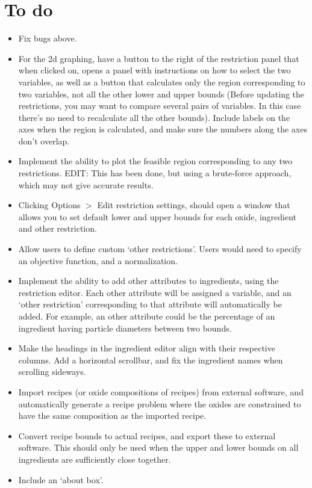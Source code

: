 \documentclass[a4paper,10pt]{article}
\begin{document}
\section{To do}
\begin{itemize}
\item Fix bugs above.
\item For the 2d graphing, have a button to the right of the restriction panel that when clicked on, opens a panel with instructions on how to select the two variables, as well as a button that calculates only the region corresponding to two variables, not all the other lower and upper bounds (Before updating the restrictions, you may want to compare several pairs of variables. In this case there's no need to recalculate all the other bounds). Include labels on the axes when the region is calculated, and make sure the numbers along the axes don't overlap. 
\item Implement the ability to plot the feasible region corresponding to any two restrictions. EDIT: This has been done, but using a brute-force approach, which may not give accurate results.
\item Clicking Options $>$ Edit restriction settings, should open a window that allows you to set default lower and upper bounds for each oxide, ingredient and other restriction.
\item Allow users to define custom `other restrictions'. Users would need to specify an objective function, and a normalization.
\item Implement the ability to add other attributes to ingredients, using the restriction editor. Each other attribute will be assigned a variable, and an `other restriction' corresponding to that attribute will automatically be added. For example, an other attribute could be the percentage of an ingredient having particle diameters between two bounds.
\item Make the headings in the ingredient editor align with their respective columns. Add a horizontal scrollbar, and fix the ingredient names when scrolling sideways.
\item Import recipes (or oxide compositions of recipes) from external software, and automatically generate a recipe problem where the oxides are constrained to have the same composition as the imported recipe.
\item Convert recipe bounds to actual recipes, and export these to external software. This should only be used when the upper and lower bounds on all ingredients are sufficiently close together.
\item Include an `about box'. 
\end{itemize}
\end{document}
